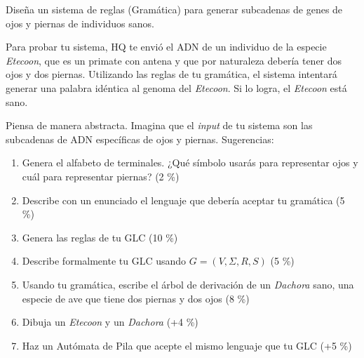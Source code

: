 \documentclass[]{book}
\theoremstyle{definition}
\begin{document}
Diseña un sistema de reglas (Gramática) para generar subcadenas de genes de ojos y piernas de individuos sanos.

Para probar tu sistema, HQ te envió el ADN de un individuo de la especie \textit{Etecoon}, que es un primate con antena y que por naturaleza debería tener dos ojos y dos piernas.
Utilizando las reglas de tu gramática, el sistema intentará generar una palabra idéntica al genoma del \textit{Etecoon}.
Si lo logra, el \textit{Etecoon} está sano.

Piensa de manera abstracta.
Imagina que el \textit{input} de tu sistema son las subcadenas de ADN específicas de ojos y piernas. Sugerencias:

\begin{enumerate}[label=\tt \alph*)]
    \item Genera el alfabeto de terminales. ¿Qué símbolo usarás para representar ojos y cuál para representar piernas? (2 \%)
    \item Describe con un enunciado el lenguaje que debería aceptar tu gramática (5 \%)
    \item Genera las reglas de tu GLC (10 \%)
    \item Describe formalmente tu GLC usando $G = (V, \Sigma, R, S)$ (5 \%)
    \item Usando tu gramática, escribe el árbol de derivación de un \textit{Dachora} sano, una especie de ave que tiene dos piernas y dos ojos (8 \%)
    \item Dibuja un \textit{Etecoon} y un \textit{Dachora} (+4 \%)
    \item Haz un Autómata de Pila que acepte el mismo lenguaje que tu GLC (+5 \%)
\end{enumerate}
\end{document}
